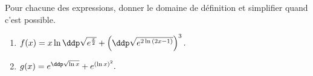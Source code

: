 
\begin{exercice}  \;
Pour chacune des expressions, donner le domaine de d\'efinition et simplifier quand c'est possible.
\begin{enumerate}
\item $f(x)=x\ln{\ddp\sqrt{e^{\frac{x}{2}}}}+\left( \ddp\sqrt{e^{2\ln{(2x-1)}}} \right)^3.$ 
\item $g(x)=e^{\ddp\sqrt{\ln{x}}}+e^{(\ln{x})^2}.$
\end{enumerate}
\end{exercice}